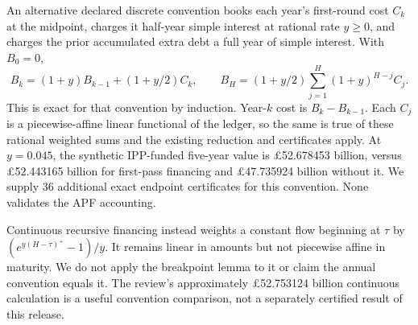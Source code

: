 An alternative declared discrete convention books each year's first-round cost $C_k$ at the midpoint, charges it half-year simple interest at rational rate $y\ge0$, and charges the prior accumulated extra debt a full year of simple interest. With $B_0=0$,
\[
B_k=(1+y)B_{k-1}+(1+y/2)C_k,\qquad
B_H=(1+y/2)\sum_{j=1}^H(1+y)^{H-j}C_j.
\]
This is exact for that convention by induction. Year-$k$ cost is $B_k-B_{k-1}$. Each $C_j$ is a piecewise-affine linear functional of the ledger, so the same is true of these rational weighted sums and the existing reduction and certificates apply. At $y=0.045$, the synthetic IPP-funded five-year value is \pounds52.678453 billion, versus \pounds52.443165 billion for first-pass financing and \pounds47.735924 billion without it. We supply 36 additional exact endpoint certificates for this convention. None validates the APF accounting.

Continuous recursive financing instead weights a constant flow beginning at $\tau$ by $(e^{y(H-\tau)^+}-1)/y$. It remains linear in amounts but not piecewise affine in maturity. We do not apply the breakpoint lemma to it or claim the annual convention equals it. The review's approximately \pounds52.753124 billion continuous calculation is a useful convention comparison, not a separately certified result of this release.
